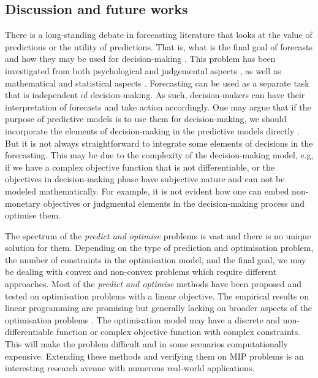 \documentclass[graybox]{svmult}
\begin{document}


\subsection{Discussion and future works}\label{discussion1}

There is a long-standing debate in forecasting literature that looks at the value of predictions or the utility of predictions. That is, what is the final goal of forecasts and how they may be used for decision-making \cite{abolghasemi2021state}. This problem has been investigated from both psychological and judgemental aspects \cite{goodwin2009common}, as well as mathematical and statistical aspects \cite{abolghasemi2021effectively}. Forecasting can be used as a separate task that is independent of decision-making. As such, decision-makers can have their interpretation of forecasts and take action accordingly. One may argue that if the purpose of predictive models is to use them for decision-making, we should incorporate the elements of decision-making in the predictive models directly \cite{bertsimas2019machine,Wilder2019-wq}. But it is not always straightforward to integrate some elements of decisions in the forecasting. This may be due to the complexity of the decision-making model, e.g, if we have a complex objective function that is not differentiable, or the objectives in decision-making phase have subjective nature and can not be modeled mathematically. For example, it is not evident how one can embed non-monetary objectives or judgmental elements in the decision-making process and optimise them. 

The spectrum of the \textit{predict and optimise} problems is vast and there is no unique solution for them. Depending on the type of prediction and optimisation problem, the number of constraints in the optimisation model, and the final goal, we may be dealing with convex and non-convex problems which require different approaches. Most of the \textit{predict and optimise} methods have been proposed and tested on optimisation problems with a linear objective. The empirical results on linear programming are promising but generally lacking on broader aspects of the optimisation problems \cite{Donti_undated-sq}. The optimisation model may have a discrete and non-differentiable function or complex objective function with complex constraints. This will make the problem difficult and in some scenarios computationally expensive. Extending these methods and verifying them on MIP problems is an interesting research avenue with numerous real-world applications. 
\end{document}
